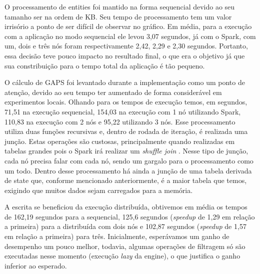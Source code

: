O processamento de entities foi mantido na forma sequencial devido ao seu 
tamanho ser na ordem de KB. Seu tempo de processamento tem um valor irrisório 
a ponto de ser difícil de observar no gráfico. Em média, para a execução com a 
aplicação no modo sequencial ele levou 3,07 segundos, já com o Spark, com 
um, dois e três nós foram respectivamente 2,42, 2,29 e 2,30 segundos. Portanto, 
essa decisão teve pouco impacto no resultado final, o que era o objetivo já que 
sua constribuição para o tempo total da aplicação é tão pequeno.

O cálculo de GAPS foi levantado durante a implementação como um ponto de 
atenção, devido ao seu tempo ter aumentado de forma considerável em experimentos 
locais. Olhando para os tempos de execução temos, em segundos, 71,51 na 
execução sequencial, 154,03 na execução com 1 nó utilizando Spark, 110,83 na 
execução com 2 nós e 95,22 utilizando 3 nós. Esse processamento utiliza duas 
funções recursivas e, dentro de rodada de iteração, é realizada uma junção. 
Estas operações são custosas, principalmente quando realizadas em tabelas 
grandes pois o Spark irá realizar um \emph{shuffle join} 
\cite{ref:sparkbook}. Nesse tipo de junção, cada nó precisa falar com cada nó, 
sendo um gargalo para o processamento como um todo. Dentro desse processamento 
há ainda a junção de uma tabela derivada de state que, conforme mencionado 
anteriormente, é a maior tabela que temos, exigindo que muitos dados sejam 
carregados para a memória.

A escrita se beneficiou da execução distribuída, obtivemos em média os 
tempos de 162,19 segundos para a sequencial, 125,6 segundos (\textit{speedup} 
de 1,29 em relação a primeira) para a distribuída com dois nós e 102,87 
segundos (\textit{speedup} de 1,57 em relação a primeira) para três. 
Inicialmente, esperávamos um ganho de desempenho um pouco melhor, todavia, 
algumas operações de filtragem só são executadas nesse momento (execução 
\textit{lazy} da engine), o que justifica o ganho inferior ao esperado.


